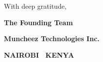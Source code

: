 \documentclass[11pt,a4paper]{article}
\begin{document}
\begin{center}
\vspace{1.5cm}

\textsf{\small\color{DeepCharcoal} With deep gratitude,}

\vspace{0.3cm}

{\fontsize{14}{18}\sffamily\bfseries\color{CorporateNavy} The Founding Team}

\vspace{0.1cm}

\textsf{\small\bfseries\color{LinkBlue} Muncheez Technologies Inc.}

\vfill

\textsf{\scriptsize\bfseries\color{DeepCharcoal} NAIROBI \textperiodcentered\ KENYA}

\end{center}
\end{document}
